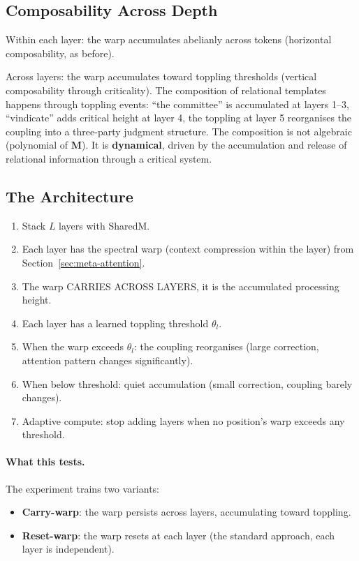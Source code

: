 \documentclass[11pt, a4paper]{article}
\newcommand{\M}{\mathbf{M}}
\theoremstyle{plain}
\theoremstyle{definition}
\theoremstyle{remark}
\begin{document}
\subsection{Composability Across Depth}

Within each layer: the warp accumulates abelianly across tokens (horizontal composability, as before).

Across layers: the warp accumulates toward toppling thresholds (vertical composability through criticality).
The composition of relational templates happens through toppling events: ``the committee'' is accumulated at layers 1--3, ``vindicate'' adds critical height at layer 4, the toppling at layer 5 reorganises the coupling into a three-party judgment structure.
The composition is not algebraic (polynomial of $\M$).
It is \textbf{dynamical}, driven by the accumulation and release of relational information through a critical system.

\subsection{The Architecture}

\begin{enumerate}[nosep]
\item Stack $L$ layers with SharedM.
\item Each layer has the spectral warp (context compression within the layer) from Section~\ref{sec:meta-attention}.
\item The warp CARRIES ACROSS LAYERS, it is the accumulated processing height.
\item Each layer has a learned toppling threshold $\theta_l$.
\item When the warp exceeds $\theta_l$: the coupling reorganises (large correction, attention pattern changes significantly).
\item When below threshold: quiet accumulation (small correction, coupling barely changes).
\item Adaptive compute: stop adding layers when no position's warp exceeds any threshold.
\end{enumerate}

\paragraph{What this tests.}
The experiment trains two variants:
\begin{itemize}[nosep]
\item \textbf{Carry-warp}: the warp persists across layers, accumulating toward toppling.
\item \textbf{Reset-warp}: the warp resets at each layer (the standard approach, each layer is independent).
\end{itemize}
\end{document}
